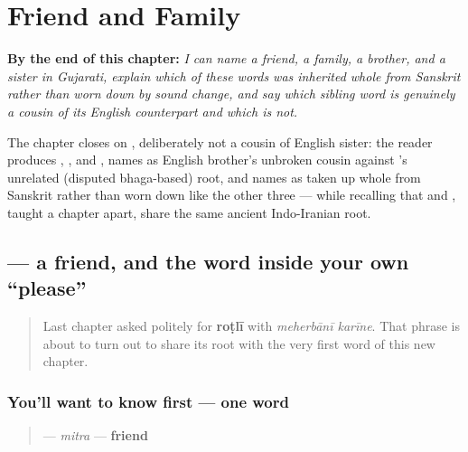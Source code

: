 
\chapter{Friend and Family}
\label{ch:gu-friend-and-family}

\begin{chapteropening}
\textbf{By the end of this chapter:} \emph{I can name a friend, a family, a brother, and a sister in Gujarati, explain which of these words was inherited whole from Sanskrit rather than worn down by sound change, and say which sibling word is genuinely a cousin of its English counterpart and which is not.}

The chapter closes on , deliberately not a cousin of English sister: the reader produces , ,  and , names  as English brother's unbroken cousin against 's unrelated (disputed bhaga-based) root, and names  as taken up whole from Sanskrit rather than worn down like the other three — while recalling that  and , taught a chapter apart, share the same ancient Indo-Iranian root.
\end{chapteropening}

\section[mitra]{ — a friend, and the word inside your own \textquotedblleft{}please\textquotedblright{}}

\label{lesson:GU-C11-mitra}



\begin{quote}
Last chapter asked politely for \textbf{roṭlī} with \emph{meherbānī karīne}. That phrase is about to turn out to share its root with the very first word of this new chapter.
\end{quote}

\subsection*{You'll want to know first — one word}
\begin{quote}
\textbf{} — \emph{mitra} — \textbf{friend}
\end{quote}


